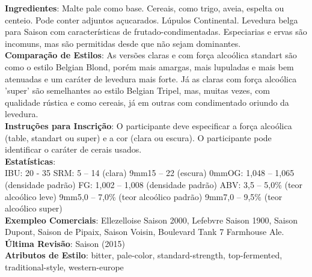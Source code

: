 \textbf{Ingredientes}: Malte pale como base. Cereais, como trigo, aveia, espelta ou centeio. Pode conter adjuntos açucarados. Lúpulos Continental. Levedura belga para Saison com características de frutado-condimentadas. Especiarias e ervas são incomuns, mas são permitidas desde que não sejam dominantes. \\
\textbf{Comparação de Estilos}: As versões claras e com força alcoólica standart são como o estilo Belgian Blond, porém mais amargas, mais lupuladas e mais bem atenuadas e um caráter de levedura mais forte. Já as claras com força alcoólica 'super' são semelhantes ao estilo Belgian Tripel, mas, muitas vezes, com qualidade rústica e como cereais, já em outras com condimentado oriundo da levedura. \\
\textbf{Instruções para Inscrição}: O participante deve especificar a força alcoólica (table, standart ou super) e a cor (clara ou escura). O participante pode identificar o caráter de cerais usados. \\
\textbf{Estatísticas}: \\
IBU: 20 - 35
SRM: 5 – 14 (clara)
\leftskip9mm15 – 22 (escura)
\leftskip0mmOG: 1,048 – 1,065 (densidade padrão)
FG: 1,002 – 1,008 (densidade padrão)
ABV: 3,5 – 5,0\% (teor alcoólico leve)
\leftskip9mm5,0 – 7,0\% (teor alcoólico padrão)
\leftskip9mm7,0 – 9,5\% (teor alcoólico super)\\
\textbf{Exempleo Comerciais}: Ellezelloise Saison 2000, Lefebvre Saison 1900, Saison Dupont, Saison de Pipaix, Saison Voisin, Boulevard Tank 7 Farmhouse Ale. \\
\textbf{Última Revisão}: Saison (2015) \\
\textbf{Atributos de Estilo}: bitter, pale-color, standard-strength, top-fermented, traditional-style, western-europe
